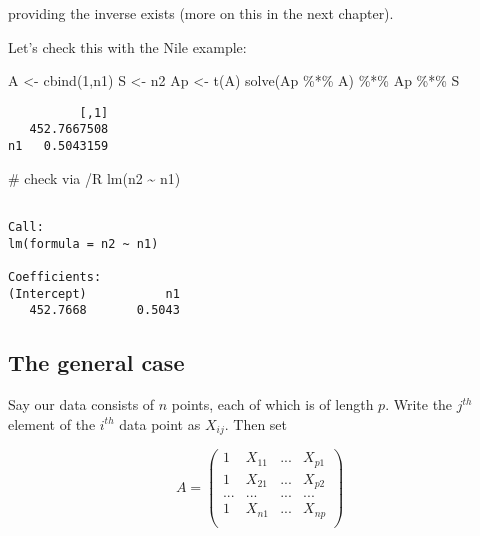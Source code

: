 \documentclass[
  letterpaper,
  DIV=11,
  numbers=noendperiod,
  oneside]{scrreprt}
\newenvironment{Shaded}{\begin{snugshade}}{\end{snugshade}}
\newcommand{\CommentTok}[1]{\textcolor[rgb]{0.37,0.37,0.37}{#1}}
\newcommand{\DecValTok}[1]{\textcolor[rgb]{0.68,0.00,0.00}{#1}}
\newcommand{\FunctionTok}[1]{\textcolor[rgb]{0.28,0.35,0.67}{#1}}
\newcommand{\NormalTok}[1]{\textcolor[rgb]{0.00,0.23,0.31}{#1}}
\newcommand{\OtherTok}[1]{\textcolor[rgb]{0.00,0.23,0.31}{#1}}
\newcommand{\SpecialCharTok}[1]{\textcolor[rgb]{0.37,0.37,0.37}{#1}}
\begin{document}
providing the inverse exists (more on this in the next chapter).

Let's check this with the Nile example:

\begin{Shaded}
\begin{Highlighting}[]
\NormalTok{A }\OtherTok{\textless{}{-}} \FunctionTok{cbind}\NormalTok{(}\DecValTok{1}\NormalTok{,n1)}
\NormalTok{S }\OtherTok{\textless{}{-}}\NormalTok{ n2}
\NormalTok{Ap }\OtherTok{\textless{}{-}} \FunctionTok{t}\NormalTok{(A)}
\FunctionTok{solve}\NormalTok{(Ap }\SpecialCharTok{\%*\%}\NormalTok{ A) }\SpecialCharTok{\%*\%}\NormalTok{ Ap }\SpecialCharTok{\%*\%}\NormalTok{ S}
\end{Highlighting}
\end{Shaded}

\begin{verbatim}
          [,1]
   452.7667508
n1   0.5043159
\end{verbatim}

\begin{Shaded}
\begin{Highlighting}[]
\CommentTok{\# check via /R}
\FunctionTok{lm}\NormalTok{(n2 }\SpecialCharTok{\textasciitilde{}}\NormalTok{ n1)}
\end{Highlighting}
\end{Shaded}

\begin{verbatim}

Call:
lm(formula = n2 ~ n1)

Coefficients:
(Intercept)           n1  
   452.7668       0.5043  
\end{verbatim}

\hypertarget{the-general-case}{%
\subsection{The general case}\label{the-general-case}}

Say our data consists of \(n\) points, each of which is of length \(p\).
Write the \(j^{th}\) element of the \(i^{th}\) data point as \(X_{ij}\).
Then set

\[
A =
\left (
\begin{array}{rrrr}
1 & X_{11} & ... & X_{p1} \\
1 & X_{21} & ... & X_{p2} \\
... & ... & ... & ... \\
1 & X_{n1} & ... & X_{np} \\
\end{array}
\right )
\]
\end{document}
